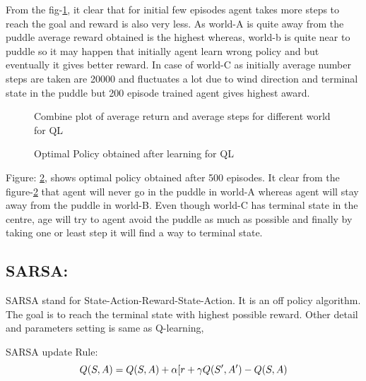 \documentclass[preprint,12pt]{elsarticle}
\begin{document}
From the fig-\ref{fig:combiQ}, it clear that for initial few episodes agent takes more steps to reach the goal and reward is also very less. As world-A is quite away from the puddle average reward obtained is the highest whereas, world-b is quite near to puddle so it may happen that initially agent learn wrong policy and but eventually it gives better reward. In case of world-C as initially average number steps are taken are 20000 and fluctuates a lot due to wind direction and terminal state in the puddle but 200 episode trained agent gives highest award. 

\begin{figure}[H]
	\centering  
	\caption{Combine plot of average return and average steps for different world for QL}
	\label{fig:combiQ}
\end{figure}


\begin{figure}[H]
	\centering  
	\caption{Optimal Policy obtained after learning for QL}
	\label{fig:policyQ}
\end{figure}

Figure: \ref{fig:policyQ}, shows optimal policy obtained after 500 episodes. It clear from the figure-\ref{fig:policyQ} that agent will never go in the puddle in world-A whereas agent will stay away from the puddle in world-B. Even though world-C has terminal state in the centre, age will try to agent avoid the puddle as much as possible and finally by taking one or least step it will find a way to terminal state. 



\subsection{SARSA:}
SARSA stand for State-Action-Reward-State-Action. It is an off policy algorithm. The goal is to reach the terminal state with highest possible reward. Other detail and parameters setting is same as Q-learning,

SARSA update Rule: \cite{sutton2018reinforcement}
\begin{equation}
Q(S,A) = Q(S,A) + \alpha[r + \gamma \space Q(S',A') -Q(S,A)
\end{equation}
\end{document}

